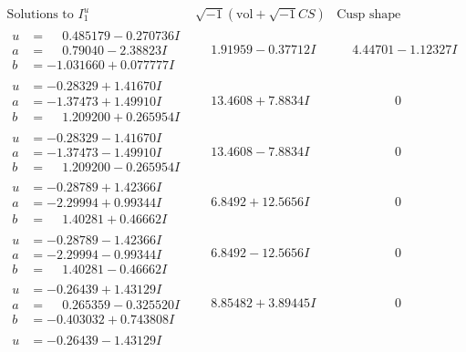 \documentclass[1p]{elsarticle_modified}
\theoremstyle{definition}
\newcommand{\I}{\sqrt{-1}}
\begin{document}
$$\begin{array}{c|c|c}
\text{Solutions to }I^u_{1}& \I (\text{vol} + \sqrt{-1}CS) & \text{Cusp shape}\\
 \hline 
\begin{aligned}
u &= \phantom{-}0.485179 - 0.270736 I \\
a &= \phantom{-}0.79040 - 2.38823 I \\
b &= -1.031660 + 0.077777 I\end{aligned}
 & \phantom{-}1.91959 - 0.37712 I & \phantom{-}4.44701 - 1.12327 I \\ \hline\begin{aligned}
u &= -0.28329 + 1.41670 I \\
a &= -1.37473 + 1.49910 I \\
b &= \phantom{-}1.209200 + 0.265954 I\end{aligned}
 & \phantom{-}13.4608 + 7.8834 I & \phantom{-0.000000 } 0 \\ \hline\begin{aligned}
u &= -0.28329 - 1.41670 I \\
a &= -1.37473 - 1.49910 I \\
b &= \phantom{-}1.209200 - 0.265954 I\end{aligned}
 & \phantom{-}13.4608 - 7.8834 I & \phantom{-0.000000 } 0 \\ \hline\begin{aligned}
u &= -0.28789 + 1.42366 I \\
a &= -2.29994 + 0.99344 I \\
b &= \phantom{-}1.40281 + 0.46662 I\end{aligned}
 & \phantom{-}6.8492 + 12.5656 I & \phantom{-0.000000 } 0 \\ \hline\begin{aligned}
u &= -0.28789 - 1.42366 I \\
a &= -2.29994 - 0.99344 I \\
b &= \phantom{-}1.40281 - 0.46662 I\end{aligned}
 & \phantom{-}6.8492 - 12.5656 I & \phantom{-0.000000 } 0 \\ \hline\begin{aligned}
u &= -0.26439 + 1.43129 I \\
a &= \phantom{-}0.265359 - 0.325520 I \\
b &= -0.403032 + 0.743808 I\end{aligned}
 & \phantom{-}8.85482 + 3.89445 I & \phantom{-0.000000 } 0 \\ \hline\begin{aligned}
u &= -0.26439 - 1.43129 I \\

\end{aligned}
\end{array}$$
\end{document}
